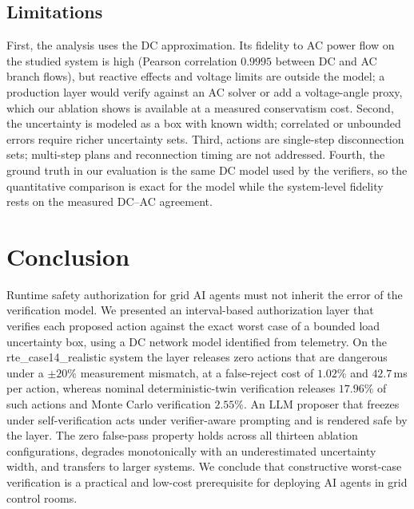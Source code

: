 \documentclass[journal]{IEEEtran}
\begin{document}
\subsection{Limitations}

First, the analysis uses the DC approximation. Its fidelity to AC power flow on
the studied system is high (Pearson correlation $0.9995$ between DC and AC
branch flows), but reactive effects and voltage limits are outside the model; a
production layer would verify against an AC solver or add a voltage-angle proxy,
which our ablation shows is available at a measured conservatism cost. Second,
the uncertainty is modeled as a box with known width; correlated or unbounded
errors require richer uncertainty sets. Third, actions are single-step
disconnection sets; multi-step plans and reconnection timing are not addressed.
Fourth, the ground truth in our evaluation is the same DC model used by the
verifiers, so the quantitative comparison is exact for the model while the
system-level fidelity rests on the measured DC--AC agreement.

\section{Conclusion}
\label{sec:conclusion}

Runtime safety authorization for grid AI agents must not inherit the error of
the verification model. We presented an interval-based authorization layer that
verifies each proposed action against the exact worst case of a bounded load
uncertainty box, using a DC network model identified from telemetry. On the
rte\_case14\_realistic system the layer releases zero actions that are dangerous
under a $\pm 20\%$ measurement mismatch, at a false-reject cost of $1.02\%$ and
$42.7$\,ms per action, whereas nominal deterministic-twin verification releases
$17.96\%$ of such actions and Monte Carlo verification $2.55\%$. An LLM proposer
that freezes under self-verification acts under verifier-aware prompting and is
rendered safe by the layer. The zero false-pass property holds across all
thirteen ablation configurations, degrades monotonically with an
underestimated uncertainty width, and transfers to larger systems. We conclude
that constructive worst-case verification is a practical and low-cost
prerequisite for deploying AI agents in grid control rooms.



\end{document}
